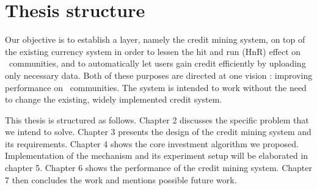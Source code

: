 \section{Thesis structure}
Our objective is to establish a layer, namely the credit mining system, on top of the existing currency system in order to lessen the hit and run (HnR) effect on \bt~communities, and to automatically let users gain credit efficiently by uploading only necessary data. Both of these purposes are directed at one vision : improving performance on \bt~communities. The system is intended to work without the need to change the existing, widely implemented credit system.

This thesis is structured as follows. Chapter 2 discusses the specific problem that we intend to solve. Chapter 3 presents the design of the credit mining system and its requirements. Chapter 4 shows the core investment algorithm we proposed. Implementation of the mechanism and its experiment setup will be elaborated in chapter 5. Chapter 6 shows the performance of the credit mining system. Chapter 7 then concludes the work and mentions possible future work.


